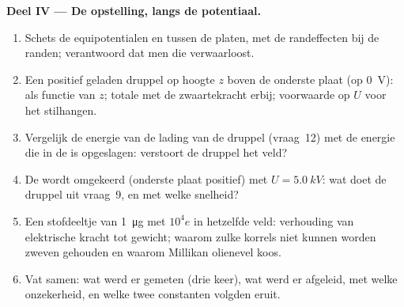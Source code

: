 \begin{problem}
\medskip
\noindent\textbf{Deel IV --- De opstelling, langs de potentiaal.}
\begin{enumerate}[resume]
  \item Schets de equipotentialen en  tussen de platen,
        met de randeffecten bij de randen; verantwoord dat men die verwaarloost.
  \item Een positief geladen druppel op hoogte $z$ boven de onderste plaat
        (op \qty{0}{V}):  als functie van $z$; totale
         met de zwaartekracht erbij; voorwaarde op $U$ voor het
        stilhangen.
  \item Vergelijk de energie van de lading van de druppel (vraag~12) met de
        energie die in de  is opgeslagen: verstoort de druppel het veld?
  \item De  wordt omgekeerd (onderste plaat positief) met
        $U = \qty{5.0}{kV}$: wat doet de druppel uit vraag~9, en met
        welke snelheid?
  \item Een stofdeeltje van \qty{1}{\micro g} met $10^4e$ in hetzelfde
        veld: verhouding van elektrische kracht tot gewicht; waarom zulke korrels niet
        kunnen worden zweven gehouden en waarom Millikan olienevel koos.
  \item Vat samen: wat werd er gemeten (drie keer), wat werd er afgeleid,
        met welke onzekerheid, en welke twee constanten volgden eruit.
\end{enumerate}
\end{problem}
